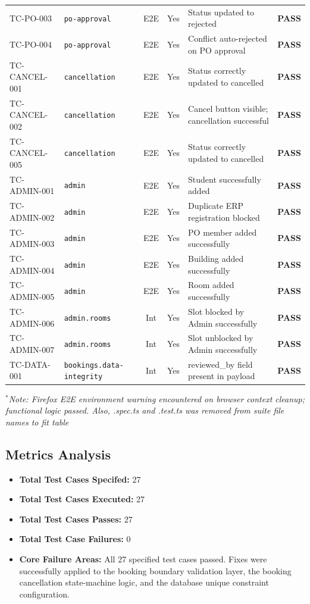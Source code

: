 \documentclass[11pt,a4paper]{article}
\begin{document}
\begin{center}
\begin{longtable}{@{}lp{3.6cm}ccp{4.5cm}p{2cm}@{}}
TC-PO-003 & \texttt{po-approval} & E2E & Yes & Status updated to rejected & \textbf{PASS} \\
TC-PO-004 & \texttt{po-approval} & E2E & Yes & Conflict auto-rejected on PO approval & \textbf{PASS} \\ \midrule
TC-CANCEL-001 & \texttt{cancellation} & E2E & Yes & Status correctly updated to cancelled & \textbf{PASS} \\
TC-CANCEL-002 & \texttt{cancellation} & E2E & Yes & Cancel button visible; cancellation successful & \textbf{PASS} \\
TC-CANCEL-005 & \texttt{cancellation} & E2E & Yes & Status correctly updated to cancelled & \textbf{PASS} \\ \midrule
TC-ADMIN-001 & \texttt{admin} & E2E & Yes & Student successfully added & \textbf{PASS} \\
TC-ADMIN-002 & \texttt{admin} & E2E & Yes & Duplicate ERP registration blocked & \textbf{PASS} \\
TC-ADMIN-003 & \texttt{admin} & E2E & Yes & PO member added successfully & \textbf{PASS} \\
TC-ADMIN-004 & \texttt{admin} & E2E & Yes & Building added successfully & \textbf{PASS} \\
TC-ADMIN-005 & \texttt{admin} & E2E & Yes & Room added successfully & \textbf{PASS} \\
TC-ADMIN-006 & \texttt{admin.rooms} & Int & Yes & Slot blocked by Admin successfully & \textbf{PASS} \\
TC-ADMIN-007 & \texttt{admin.rooms} & Int & Yes & Slot unblocked by Admin successfully & \textbf{PASS} \\ \midrule
TC-DATA-001 & \texttt{bookings.data-integrity} & Int & Yes & reviewed\_by field present in payload & \textbf{PASS} \\
\end{longtable}
\end{center}
\noindent\textit{$^{*}$Note: Firefox E2E environment warning encountered on browser context cleanup; functional logic passed. Also, .spec.ts and .test.ts was removed from suite file names to fit table}

\subsection{Metrics Analysis}
\begin{itemize}
    \item \textbf{Total Test Cases Specifed:} 27
    \item \textbf{Total Test Cases Executed:} 27
    \item \textbf{Total Test Cases Passes:} 27
    \item \textbf{Total Test Case Failures:} 0
    \item \textbf{Core Failure Areas:} All 27 specified test cases passed. Fixes were successfully applied to the booking boundary validation layer, the booking cancellation state-machine logic, and the database unique constraint configuration.
\end{itemize}
\end{document}
